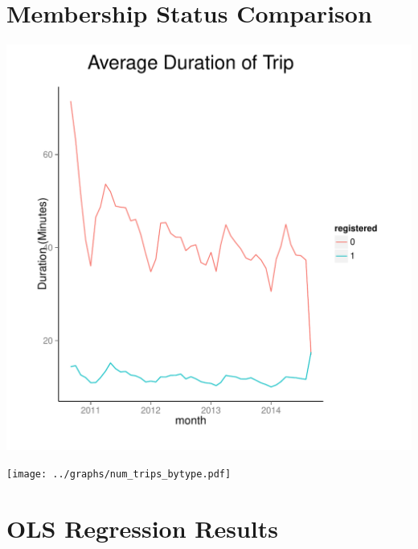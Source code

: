 \documentclass[12pt]{article}
\begin{document}
\section{Membership Status Comparison}

\begin{minipage}{.5\textwidth}
\includegraphics[scale=0.5]{../graphs/avg_duration_bytype.pdf}
\end{minipage}%
\begin{minipage}{.5\textwidth}
\texttt{[image: ../graphs/num\_trips\_bytype.pdf]}
\end{minipage}

\section{OLS Regression Results}


\end{document}
